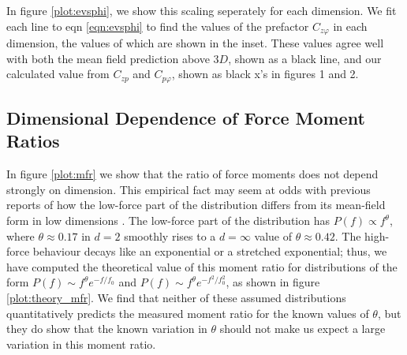 In figure \ref{plot:evsphi}, we show this scaling seperately for each dimension. We fit each line to eqn \ref{eqn:evsphi} to find the values of the prefactor $C_{z\varphi}$ in each dimension, the values of which are shown in the inset. These values agree well with both the mean field prediction above $3D$, shown as a black line, and our calculated value from $C_{zp}$ and $C_{p\varphi}$, shown as black x's in figures 1
and 2.

%
\subsection{Dimensional Dependence of Force Moment Ratios}
In figure \ref{plot:mfr} we show that the ratio of force moments does not depend strongly on dimension. This empirical fact may seem at odds with previous reports of how the low-force part of the distribution differs from its mean-field form in low dimensions \cite{charbonneau_jamming_2015,mueth_force_1998}. The low-force part of the distribution has $P(f) \propto f^\theta$, where $\theta\approx 0.17$ in $d=2$ smoothly rises to a $d=\infty$ value of $\theta \approx 0.42$. The high-force behaviour decays like an exponential or a stretched exponential; thus, we have computed the theoretical value of this moment ratio for distributions of the form $P(f) \sim f^\theta e^{-f /f_0}$ and $P(f) \sim f^\theta e^{-f^2 /f_0^2}$, as shown in figure \ref{plot:theory_mfr}. We find that neither of these assumed distributions quantitatively predicts the measured moment ratio for the known values of $\theta$, but they do show that the known variation in $\theta$ should not make us expect a large variation in this moment ratio.



